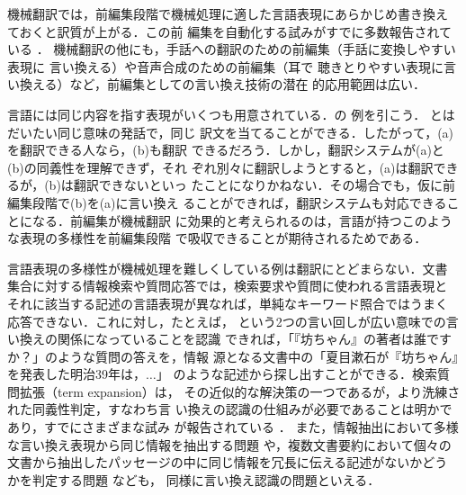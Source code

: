 機械翻訳では，前編集段階で機械処理に適した言語表現にあらかじめ書き換え
ておくと訳質が上がる\cite{shirai:95:a,kato:97:a,yoshimi:00:b}．この前
編集を自動化する試みがすでに多数報告されている
\cite{kim:94:a,shirai:95:a,chandrasekar:96:a,nyberg:00,yoshimi:00:a,yoshimi:00:b,imamura:01,YamamotoKazuhide:02:c}．
機械翻訳の他にも，手話への翻訳のための前編集（手話に変換しやすい表現に
言い換える）\cite{adachi:92:a,tokuda:98}や音声合成のための前編集（耳で
聴きとりやすい表現に言い換える）など，前編集としての言い換え技術の潜在
的応用範囲は広い．

言語には同じ内容を指す表現がいくつも用意されている．\cite{sato:01:a}の
例を引こう．
とはだいたい同じ意味の発話で，同じ
訳文を当てることができる．したがって，(a)を翻訳できる人なら，(b)も翻訳
できるだろう．しかし，翻訳システムが(a)と(b)の同義性を理解できず，それ
ぞれ別々に翻訳しようとすると，(a)は翻訳できるが，(b)は翻訳できないといっ
たことになりかねない．その場合でも，仮に前編集段階で(b)を(a)に言い換え
ることができれば，翻訳システムも対応できることになる．前編集が機械翻訳
に効果的と考えられるのは，言語が持つこのような表現の多様性を前編集段階
で吸収できることが期待されるためである．

言語表現の多様性が機械処理を難しくしている例は翻訳にとどまらない．文書
集合に対する情報検索や質問応答では，検索要求や質問に使われる言語表現と
それに該当する記述の言語表現が異なれば，単純なキーワード照合ではうまく
応答できない．これに対し，たとえば，
という2つの言い回しが広い意味での言い換えの関係になっていることを認識
できれば，「『坊ちゃん』の著者は誰ですか？」のような質問の答えを，情報
源となる文書中の「夏目漱石が『坊ちゃん』を発表した明治39年は，$\ldots$」
のような記述から探し出すことができる．検索質問拡張（term expansion）は，
その近似的な解決策の一つであるが，より洗練された同義性判定，すなわち言
い換えの認識の仕組みが必要であることは明かであり，すでにさまざまな試み
が報告されている
\cite{jacquemin:97,hikasa:99:a,anick:99:a,hirata:00:a,shiraki:00:a,tomuro:01:a,ravichandran:02,hermjakob:02,sasaki:02,duclaye:03,moldovan:03,takahashi:03:c,yoshikane:03}．
また，情報抽出において多様な言い換え表現から同じ情報を抽出する問題
\cite{sekine:01,shinyama:02,shinyama:03}や，複数文書要約において個々の
文書から抽出したパッセージの中に同じ情報を冗長に伝える記述がないかどう
かを判定する問題
\cite{mckeown:99,barzilay:99,ueda:00,narimatsu:02,barzilay:03:c}なども，
同様に言い換え認識の問題といえる．

